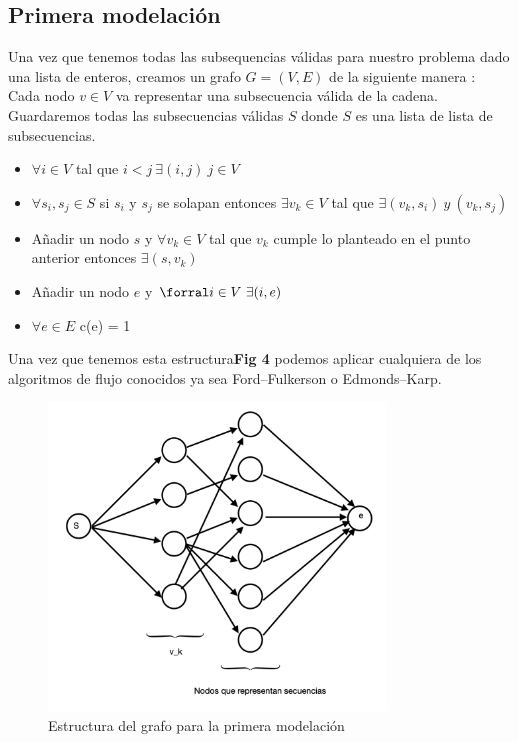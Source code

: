 \documentclass[sn-mathphys,Numbered]{sn-jnl}%
\theoremstyle{thmstyleone}%
\theoremstyle{thmstyletwo}%
\theoremstyle{thmstylethree}%
\begin{document}
\subsection*{Primera modelaci\'on}
Una vez que tenemos todas las subsequencias v\'alidas para nuestro problema dado una lista de enteros, creamos un grafo $G = (V,E)$ de la siguiente manera :\\
Cada nodo $v \in V $ va representar una subsecuencia v\'alida de la cadena.\\
Guardaremos todas las subsecuencias v\'alidas $S$ donde $S$ es una lista de lista de subsecuencias.
\begin{itemize}
    \item  $\forall i \in V$ tal que $i<j ~ \exists(i,j) ~j \in V$ 
    \item $\forall s_i,s_j \in S$ si $s_i$ y $s_j$ se solapan entonces $\exists v_k \in V$ tal que $\exists (v_k,s_i)~y~(v_k,s_j)$
    \item A\~nadir un nodo $s$ y $\forall v_k\in V $ tal que $v_k$ cumple lo planteado en el punto anterior entonces $\exists(s,v_k)$
    \item A\~nadir un nodo $e$ y $\forral i\in V ~\exists(i,e)$
    \item $\forall e \in E$ c(e) = 1
\end{itemize}
Una vez que tenemos esta estructura\textbf{Fig 4} podemos aplicar cualquiera de los algoritmos de flujo conocidos ya sea Ford–Fulkerson o Edmonds–Karp.\\
\begin{figure}[htb]
        \centering
        \includegraphics[width=0.8\textwidth]{Screenshot 2023-05-06 at 12.57.09 AM.png}
        \centering
        \caption{Estructura del grafo para la primera modelaci\'on}
    \end{figure}
\end{document}
